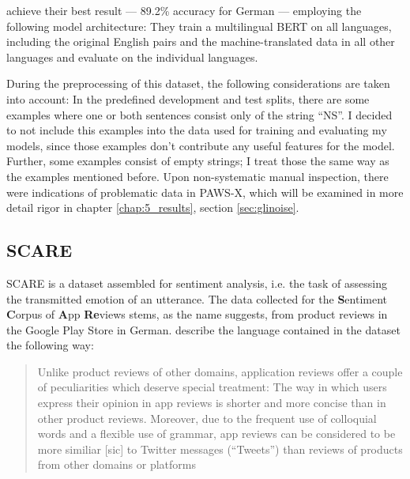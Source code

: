 
\cite{yang2019paws} achieve their best result --- 89.2\% accuracy for German --- employing the
following model architecture:
They train a multilingual BERT on all languages, including the original English pairs and the
machine-translated data in all other languages and evaluate on the individual languages.

During the preprocessing of this dataset, the following considerations are taken into account: In
the predefined development and test splits, there are some examples where one or both sentences
consist only of the string ``NS''. I decided to not include this examples into the data used for
training and evaluating my models, since those examples don't contribute any useful features for
the model. Further, some examples consist of
empty strings; I treat those the same way as the examples mentioned before. Upon non-systematic
manual inspection, there were indications of problematic data in PAWS-X, which will be examined in
more detail rigor in chapter \ref{chap:5_results}, section \ref{sec:glinoise}.


\subsection{SCARE}

SCARE is a dataset assembled for sentiment analysis, i.e. the task of assessing the
transmitted emotion of an utterance. The data collected for the \textbf{S}entiment
\textbf{C}orpus of \textbf{A}pp \textbf{Re}views stems, as the name suggests, from
product reviews in the Google Play Store in German. \cite{sanger2016scare} describe
the language contained in the dataset the following way:

\begin{quote}
  Unlike product reviews of other domains, \textelp{} application reviews
  offer a couple of peculiarities which deserve special treatment: The way
  in which users express their opinion in app reviews is shorter and more
  concise than in other product reviews. Moreover, due to the frequent use
  of colloquial words and a flexible use of grammar, app reviews can be
  considered to be more similiar [sic] to Twitter messages (“Tweets”) than
  reviews of products from other domains or platforms
\end{quote}

